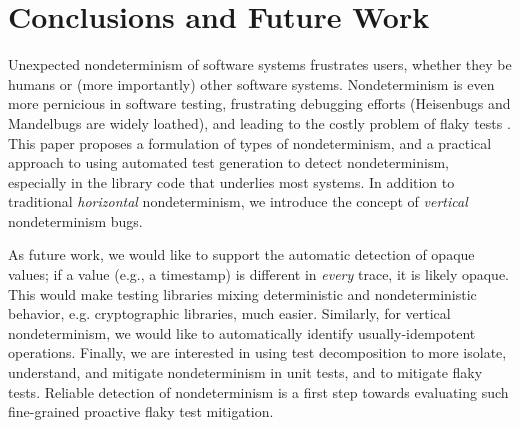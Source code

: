 \section{Conclusions and Future Work}

Unexpected nondeterminism of software systems frustrates users,
whether they be humans or (more importantly) other software systems.
Nondeterminism is even more pernicious in software testing,
frustrating debugging efforts (Heisenbugs \cite{Heisenbug} and
Mandelbugs \cite{GrottkeBugs,FaultTriggers} are widely loathed), and
leading to the costly problem of flaky tests
\cite{miccoflaky,listfieldtestanalysis}.
This paper proposes a formulation of types of nondeterminism, and a
practical approach to using automated test generation to detect
nondeterminism, especially in the library code that underlies most
systems. In addition to traditional \emph{horizontal} nondeterminism, we introduce
the concept of \emph{vertical} nondeterminism bugs.  
\begin{comment}
We implemented our approach in the
TSTL automated test generation system for Python, and demonstrated the
simplicity and utility of the approach on real-world examples.
\end{comment}

As future work, we would like to support the automatic detection of opaque
values; if a value (e.g., a timestamp) is different in \emph{every}
trace, it is likely opaque.  This would make
testing libraries mixing deterministic and nondeterministic
behavior, e.g. cryptographic libraries, much easier. Similarly, for
vertical nondeterminism, we would like to
automatically identify usually-idempotent operations.
Finally, we are interested in using test decomposition
\cite{Composition} to more isolate, understand, and mitigate
nondeterminism in unit tests, and to mitigate flaky tests.
Reliable detection of nondeterminism is a first step towards
evaluating such fine-grained proactive flaky test mitigation.

\begin{comment}
Finally, it would be useful to implement versions of our formalisms in
test generation tools for other languages with a suitable notion of
action.  For example, the DeepState
\cite{DeepState,DeepStateTutorial,deepstaterepo} tool for
property-based fuzzing and symbolic-execution of C and C++ code defines
actions that are choices between C++ lambdas in a test harness,
produced by a nondeterminism operator, {\tt OneOf}.
Adding annotations of visible state (perhaps simply in the form of
blocks of address ranges in memory, a method often suitable for C and
C++ code) would make it possible to search for unexpected nondeterminism in
critical C and C++ libraries.

{\scriptsize {\bf Acknowledgments:}  The authors would like to thank John Micco,
Jeff Listfield, and Celal Ziftci at Google, for discussion of
flaky tests, Andreas Zeller and David R. MacIver for discussion of the
problem of probabilistic delta-debugging, and Chris
Colohan for discussion of sources of process-based nondeterminism.}
\end{comment}